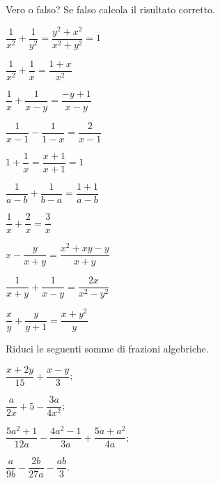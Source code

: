 \begin{esercizio}[\Ast]
\label{ese:14.21}
Vero o falso? Se falso calcola il risultato corretto.
\begin{multicols}{2}
\TabPositions{4cm}
\begin{enumeratea}
 \item $\dfrac{1}{x^{2}}+\dfrac{1}{y^{2}}=\dfrac{y^{2}+x^{2}}{x^{2}+y^{2}}=1$ \tab\boxV\quad\boxF
 \item $\dfrac{1}{x^{2}}+\dfrac{1}{x}=\dfrac{1+x}{x^{2}}$ \tab\boxV\quad\boxF
 \item $\dfrac{1}{x}+\dfrac{1}{x-y}=\dfrac{-y+1}{x-y}$ \tab\boxV\quad\boxF
 \item $\dfrac{1}{x-1}-\dfrac{1}{1-x}=\dfrac{2}{x-1}$ \tab\boxV\quad\boxF
 \item $1+\dfrac{1}{x}=\dfrac{x+1}{x+1}=1$ \tab\boxV\quad\boxF
 \item $\dfrac{1}{a-b}+\dfrac{1}{b-a}=\dfrac{1+1}{a-b}$ \tab\boxV\quad\boxF
 \item $\dfrac{1}{x}+\dfrac{2}{x}=\dfrac{3}{x}$ \tab\boxV\quad\boxF
 \item $x-\dfrac{y}{x+y}=\dfrac{x^{2}+xy-y}{x+y}$ \tab\boxV\quad\boxF
 \item $\dfrac{1}{x+y}+\dfrac{1}{x-y}=\dfrac{2x}{x^{2}-y^{2}}$ \tab\boxV\quad\boxF
 \item $\dfrac{x}{y}+\dfrac{y}{y+1}=\dfrac{x+y^{2}}{y}$ \tab\boxV\quad\boxF
\end{enumeratea}
\end{multicols}
\end{esercizio}

\begin{esercizio}[\Ast]
\label{ese:14.22}
Riduci le seguenti somme di frazioni algebriche.
\begin{multicols}{2}
\begin{enumeratea}
 \item $\dfrac{x+2y}{15}+\dfrac{x-y}{3}$;
 \item $\dfrac{a}{2x}+5-\dfrac{3a}{4x^{2}}$;
 \item $\dfrac{5a^{2}+1}{12a}-\dfrac{4a^{2}-1}{3a}+\dfrac{5a+a^{2}}{4a}$;
 \item $\dfrac{a}{9b}-\dfrac{2b}{27a}-\dfrac{ab}{3}$.
\end{enumeratea}
\end{multicols}
\end{esercizio}
\pagebreak

